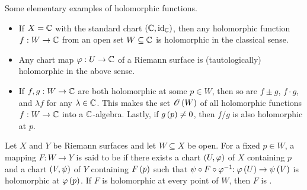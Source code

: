 \documentclass[../Moduli_Spaces_of_Riemann_Surfaces.tex]{subfiles}
\begin{document}
    \begin{example}\label{RS:exa:elementary_holomorphic_functions}
        Some elementary examples of holomorphic functions.
        \begin{itemize}
            \item If $X=\mathbb{C}$ with the standard chart $\left(\mathbb{C},\operatorname{id}_{\mathbb{C}}\right)$, then any holomorphic function $f:W\to\mathbb{C}$ from an open set $W\subseteq\mathbb{C}$ is holomorphic in the classical sense.
                \vspace{-0.05in}
            \item Any chart map $\varphi:U\to\mathbb{C}$ of a Riemann surface is (tautologically) holomorphic in the above sense.
                \vspace{-0.05in}
            \item If $f,g:W\to\mathbb{C}$ are both holomorphic at some $p\in W$, then so are $f\pm g$, $f\cdot g$, and $\lambda f$ for any $\lambda\in\mathbb{C}$. This makes the set $\mathscr{O}\left(W\right)$ of all holomorphic functions $f:W\to\mathbb{C}$ into a $\mathbb{C}$-algebra. Lastly, if $g\left(p\right)\neq0$, then $f/g$ is also holomorphic at $p$.\exqed
        \end{itemize}
    \end{example}
    \begin{definition}
        Let $X$ and $Y$ be Riemann surfaces and let $W\subseteq X$ be open. For a fixed $p\in W$, a mapping $F:W\to Y$ is said to be  if there exists a chart $\left(U,\varphi\right)$ of $X$ containing $p$ and a chart $\left(V,\psi\right)$ of $Y$ containing $F\left(p\right)$ such that $\psi\circ F\circ\varphi^{-1}\!\!:\varphi\left(U\right)\to\psi\left(V\right)$ is holomorphic at $\varphi\left(p\right)$. If $F$ is holomorphic at every point of $W$, then $F$ is .
    \end{definition}
\end{document}

